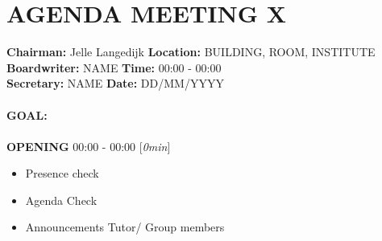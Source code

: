 \documentclass[a4paper,10pt]{article}
\begin{document}

\newpage

 \section*{\textbf{AGENDA MEETING X}}
 

\textbf{Chairman:} Jelle Langedijk \hfill \textbf{Location:} BUILDING, ROOM, INSTITUTE \\
\textbf{Boardwriter:} NAME \hfill \textbf{Time:} 00:00 - 00:00 \\
\textbf{Secretary:} NAME \hfill \textbf{Date:} DD/MM/YYYY \\

\hfill \\
\textbf{GOAL:} \\
\hfill \\
\textbf{OPENING} \hfill 00:00 - 00:00 [\textit{0min}]
\begin{itemize}
    \item Presence check
    \item Agenda Check
    \item Announcements Tutor/ Group members
\end{itemize}{}
\end{document}
